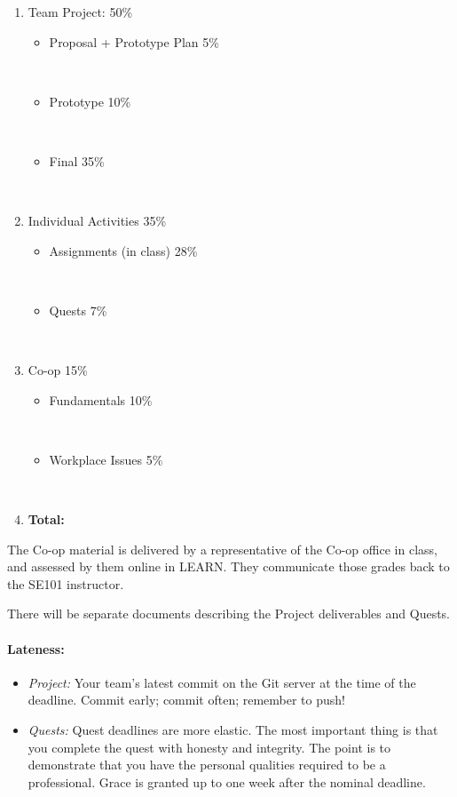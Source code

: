 \documentclass[11pt,onecolumn]{article}
\newcommand{\bi}{\begin{itemize}}
\newcommand{\ei}{\end{itemize}}
\newcommand{\be}{\begin{enumerate}}
\newcommand{\ee}{\end{enumerate}}
\newcommand{\biTight}{\vspace{-\parskip}\bi\setlength{\itemsep}{0pt}\setlength{\parskip}{0pt} }
\newcommand{\beTight}{\vspace{-\parskip}\be\setlength{\itemsep}{0pt}\setlength{\parskip}{0pt} }
\begin{document}
\hspace*{0.25in}
\begin{minipage}{4in}
\beTight
    \item Team Project: \hspace{\fill} 50\%
        \biTight
        \item Proposal + Prototype Plan \hspace{\fill} 5\% \parbox{0.5in}{~}
        \item Prototype \hspace{\fill} 10\% \parbox{0.5in}{~}
        \item Final \hspace{\fill} 35\% \parbox{0.5in}{~}
        \ei
    \item Individual Activities \hspace{\fill} 35\%
        \biTight
        \item Assignments (in class) \hspace{\fill} 28\% \parbox{0.5in}{~}
        \item Quests \hspace{\fill} 7\% \parbox{0.5in}{~}
        \ei
    \item Co-op \hspace{\fill} 15\%
        \biTight
        \item Fundamentals \hspace{\fill} 10\% \parbox{0.5in}{~}
        \item Workplace Issues \hspace{\fill} 5\% \parbox{0.5in}{~}
        \ei
    \item \textbf{Total:} \hspace{\fill} 
\ee
\end{minipage}
\vspace{0.25in}

\noindent
The Co-op material is delivered by a representative of the Co-op
office in class, and assessed by them online in LEARN. They
communicate those grades back to the SE101 instructor.

\vspace*{1em} \noindent 
%
There will be separate documents describing the Project deliverables
and Quests.

\newpage
\paragraph{Lateness:}
\biTight
    \item \emph{Project:} Your team's latest commit on the Git
    server at the time of the deadline. Commit early; commit often;
    remember to push!
    \item \emph{Quests:} Quest deadlines are more elastic. The most
    important thing is that you complete the quest with honesty and
    integrity. The point is to demonstrate that you have the personal
    qualities required to be a professional. Grace is granted up to 
    one week after the nominal deadline.
\ei
\end{document}
